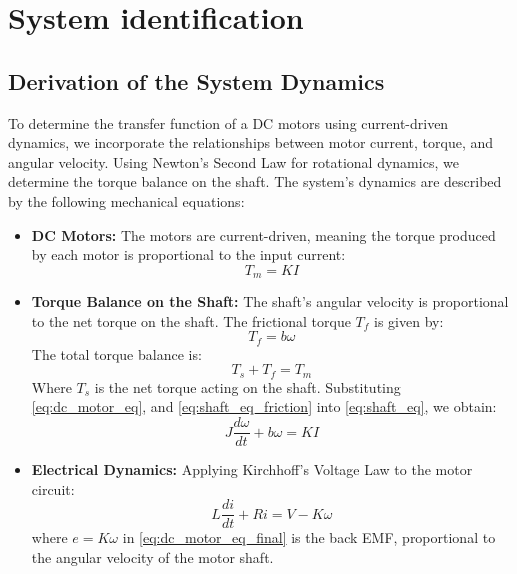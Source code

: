 \setcounter{secnumdepth}{2}

\chapter{System identification}
\label{section:identification}

\section{Derivation of the System Dynamics}

To determine the transfer function of a DC motors using current-driven dynamics, we incorporate the relationships between motor current, torque, and angular velocity. Using Newton's Second Law for rotational dynamics, we determine the torque balance on the shaft. The system's dynamics are described by the following mechanical equations:

\begin{itemize}
    \item \textbf{DC Motors:} The motors are current-driven, meaning the torque produced by each motor is proportional to the input current:
    \begin{equation}
        T_m = K I
        \label{eq:dc_motor_eq}
    \end{equation}
    
    \item \textbf{Torque Balance on the Shaft:} The shaft's angular velocity is proportional to the net torque on the shaft. The frictional torque $T_f$ is given by:
    \begin{equation}
        T_f = b \omega
        \label{eq:shaft_eq_friction}
    \end{equation}
    The total torque balance is:
    \begin{equation}
        T_s + T_f = T_m
        \label{eq:shaft_eq}
    \end{equation}
    Where $T_s$ is the net torque acting on the shaft. Substituting \eqref{eq:dc_motor_eq}, and \eqref{eq:shaft_eq_friction} into \eqref{eq:shaft_eq}, we obtain:
    \begin{equation}
        J \frac{d\omega}{dt} + b \omega = K I
        \label{eq:shaft_eq_final}
    \end{equation}
    
    \item \textbf{Electrical Dynamics:} Applying Kirchhoff's Voltage Law to the motor circuit:
    \begin{equation}
        L\frac{d i}{dt} + R i = V - K \omega
        \label{eq:dc_motor_eq_final}
    \end{equation}
    where \( e = K \omega \) in \eqref{eq:dc_motor_eq_final} is the back EMF, proportional to the angular velocity of the motor shaft.
\end{itemize}

